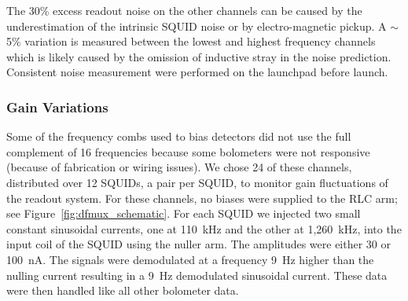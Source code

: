 \documentclass[../EBEXPaper2.tex]{subfiles}
\begin{document}
The 30\% excess readout noise on the other channels can be caused by the underestimation of the intrinsic \ac{SQUID} noise or by electro-magnetic pickup.
A $\sim$5\% variation is measured between the lowest and highest frequency channels which is likely caused by the omission of inductive stray in the noise prediction.
Consistent noise measurement were performed on the launchpad before launch.


\subsubsection{Gain Variations} 
\label{sec:readoutgain}

Some of the frequency combs used to bias detectors did not use the full complement of 16 frequencies because some bolometers were not responsive (because of fabrication or wiring issues).
We chose 24 of these channels, distributed over 12 \ac{SQUID}s, a pair per \ac{SQUID}, to monitor gain fluctuations of the readout system. 
For these channels, no biases were supplied to the RLC arm; see Figure~\ref{fig:dfmux_schematic}.
For each \ac{SQUID} we injected two small constant sinusoidal currents, one at 110~kHz and the other at 1,260~kHz, into the input coil of the \ac{SQUID} using the nuller arm.
The amplitudes were either 30 or 100~nA.
The signals were demodulated at a frequency 9~Hz higher than the nulling current resulting in a 9~Hz demodulated sinusoidal current.
These data were then handled like all other bolometer data. 
\end{document}
